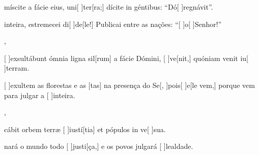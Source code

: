{  {\item {}míscite a fácie eius, uni[ ]{ter}[ra;] dícite in géntibus: ``Dó[ ]{re}{gná}vit''.~\Antiphona}%
    {\item {} inteira, estremecei di[ ]{de}[le!] Publicai entre as nações: ``[ ]{o}[ ]{Se}nhor!''~\Antiphona},
  {\item {}[ ]{ex}sultábunt ómnia ligna sil[rum] a fácie Dómini, [ ]{ve}[nit,] quóniam venit iu[ ]{ter}ram.~\Antiphona}%
    {\item {}[ ]{e}xultem as florestas e as [tas] na presença do Se[, ]{pois}[ ]{e}[le vem,] porque vem para julgar a [ ]{in}{tei}ra.~\Antiphona},
  {\item {}cábit orbem terræ [ ]{iu}{stí}[tia] et pópulos in ve[ ]{su}a.~\Antiphona}%
    {\item {}nará o mundo todo [ ]{jus}{ti}[ça,] e os povos julgará [ ]{le}{al}{da}de.~\Antiphona}
}